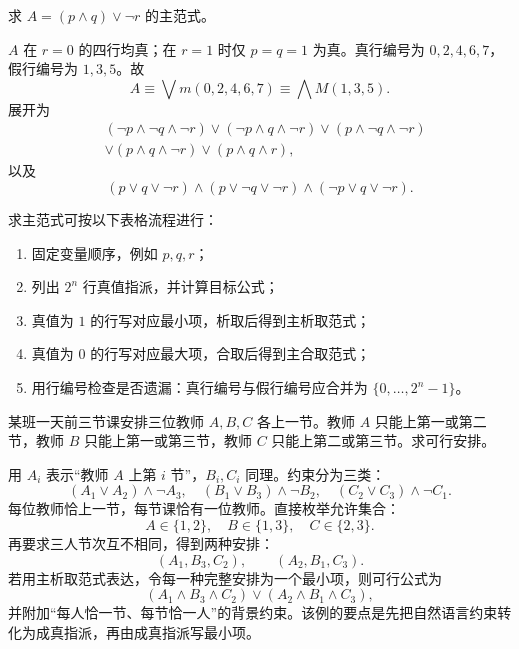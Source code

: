 \begin{example}[title={由真值表求主范式}]\label{ch1-principal-example}
求 $A=(p\land q)\lor\neg r$ 的主范式。
\begin{solution}
$A$ 在 $r=0$ 的四行均真；在 $r=1$ 时仅 $p=q=1$ 为真。真行编号为 $0,2,4,6,7$，假行编号为 $1,3,5$。故
\[
A\equiv\bigvee m(0,2,4,6,7)
\equiv\bigwedge M(1,3,5).
\]
展开为
\[
\begin{aligned}
&(\neg p\land\neg q\land\neg r)
\lor(\neg p\land q\land\neg r)
\lor(p\land\neg q\land\neg r)\\
&\lor(p\land q\land\neg r)
\lor(p\land q\land r),
\end{aligned}
\]
以及
\[
(p\lor q\lor\neg r)\land(p\lor\neg q\lor\neg r)\land(\neg p\lor q\lor\neg r).
\]
\end{solution}
\end{example}

\begin{method}[主范式的表格流程]\label{ch1-principal-table-method}
求主范式可按以下表格流程进行：
\begin{enumerate}
  \item 固定变量顺序，例如 $p,q,r$；
  \item 列出 $2^n$ 行真值指派，并计算目标公式；
  \item 真值为 $1$ 的行写对应最小项，析取后得到主析取范式；
  \item 真值为 $0$ 的行写对应最大项，合取后得到主合取范式；
  \item 用行编号检查是否遗漏：真行编号与假行编号应合并为 $\{0,\ldots,2^n-1\}$。
\end{enumerate}
\end{method}

\begin{example}[title={排课问题的主范式建模}]\label{ch1-schedule}
某班一天前三节课安排三位教师 $A,B,C$ 各上一节。教师 $A$ 只能上第一或第二节，教师 $B$ 只能上第一或第三节，教师 $C$ 只能上第二或第三节。求可行安排。
\begin{solution}
用 $A_i$ 表示“教师 $A$ 上第 $i$ 节”，$B_i,C_i$ 同理。约束分为三类：
\[
(A_1\lor A_2)\land\neg A_3,\quad
(B_1\lor B_3)\land\neg B_2,\quad
(C_2\lor C_3)\land\neg C_1.
\]
每位教师恰上一节，每节课恰有一位教师。直接枚举允许集合：
\[
A\in\{1,2\},\quad B\in\{1,3\},\quad C\in\{2,3\}.
\]
再要求三人节次互不相同，得到两种安排：
\[
(A_1,B_3,C_2),\qquad (A_2,B_1,C_3).
\]
若用主析取范式表达，令每一种完整安排为一个最小项，则可行公式为
\[
(A_1\land B_3\land C_2)\lor(A_2\land B_1\land C_3),
\]
并附加“每人恰一节、每节恰一人”的背景约束。该例的要点是先把自然语言约束转化为成真指派，再由成真指派写最小项。
\end{solution}
\end{example}

